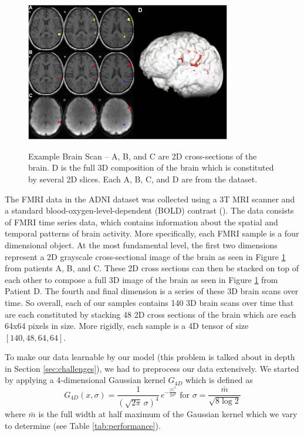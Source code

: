 \documentclass[10pt]{article}
\begin{document}
	\begin{figure}[!ht]
		\centering
		\includegraphics[width=0.8\textwidth]{figures/scan.png}
		\caption{Example Brain Scan -- A, B, and C are 2D cross-sections of the brain. D is the full 3D composition of the brain which is constituted by several 2D slices. Each A, B, C, and D are from the dataset.}
		\label{fig:example_brain_scan}
		\citep*{radiomic_texture_analysis}
	\end{figure}



	The FMRI data in the ADNI dataset was collected using a 3T MRI scanner and a standard blood-oxygen-level-dependent (BOLD) contrast (\citep*{adni}). The data consists of FMRI time series data, which contains information about the spatial and temporal patterns of brain activity. More specifically, each FMRI sample is a four dimensional object. At the most fundamental level, the first two dimensions represent a 2D grayscale cross-sectional image of the brain as seen in Figure \ref{fig:example_brain_scan} from patients A, B, and C. These 2D cross sections can then be stacked on top of each other to compose a full 3D image of the brain as seen in Figure \ref{fig:example_brain_scan} from Patient D. The fourth and final dimension is a series of these 3D brain scans over time. So overall, each of our samples contains 140 3D brain scans over time that are each constituted by stacking 48 2D cross sections of the brain which are each 64x64 pixels in size. More rigidly, each sample is a 4D tensor of size $[140, 48, 64, 64]$.

	To make our data learnable by our model (this problem is talked about in depth in Section \ref{sec:challenges}), we had to preprocess our data extensively. We started by applying a 4-dimensional Gaussian kernel $G_{4D}$ which is defined as 
	$$G_{4D}\left(x,\sigma\right)=\frac{1}{\left(\sqrt{2\pi}\,\sigma\right)^4}\,e^{-\frac{|x|^2}{2\sigma^2}}\text{ for }\sigma=\frac{\bar{m}}{\sqrt{8\log2}}$$
	where $\bar{m}$ is the full width at half maximum of the Gaussian kernel which we vary to determine (see Table \ref{tab:performance}).
	
\end{document}
